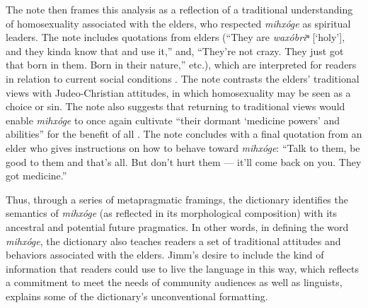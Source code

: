 \documentclass[output=paper]{LSP/langsci}
\begin{document}
The note then frames this analysis as a reflection of a traditional understanding of homosexuality associated with the elders, who respected \emph{mihx\'oge} as spiritual leaders. The note includes quotations from elders (``They are \emph{wax\'obriⁿ} [`holy'], and they kinda know that and use it,'' and, ``They're not crazy. They just got that born in them. Born in their nature,'' etc.), which are interpreted for readers in relation to current social conditions \citep[7]{Goodtracks2008}. The note contrasts the elders' traditional views with Judeo-Christian attitudes, in which homosexuality may be seen as a choice or sin. The note also suggests that returning to traditional views would enable \emph{mihx\'oge} to once again cultivate ``their dormant `medicine powers' and abilities'' for the benefit of all \citep[7]{Goodtracks2008}. The note concludes with a final quotation from an elder who gives instructions on how to behave toward \emph{mihx\'oge}: ``Talk to them, be good to them and that's all. But don't hurt them --- it'll come back on you. They got medicine.'' \citep[7]{Goodtracks2008}

Thus, through a series of metapragmatic framings, the dictionary identifies the semantics of \emph{mihx\'oge} (as reflected in its morphological composition) with its ancestral and potential future pragmatics. In other words, in defining the word \emph{mihx\'oge}, the dictionary also teaches readers a set of traditional attitudes and behaviors associated with the elders. Jimm's desire to include the kind of information that readers could use to live the language in this way, which reflects a commitment to meet the needs of community audiences as well as linguists, explains some of the dictionary's unconventional formatting.
\end{document}
